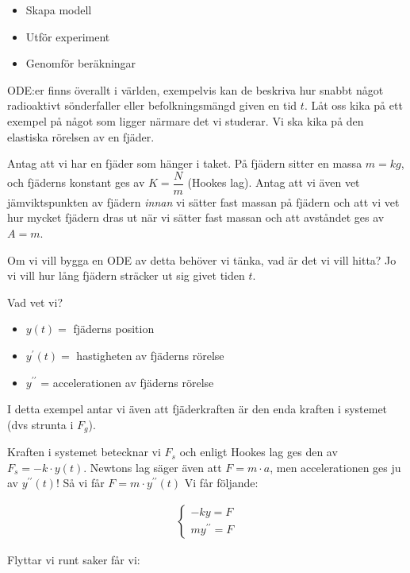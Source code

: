 \begin{itemize}
  \item Skapa modell
  \item Utför experiment
  \item Genomför beräkningar
\end{itemize}
\par\bigskip
\noindent ODE:er finns överallt i världen, exempelvis kan de beskriva hur snabbt något radioaktivt sönderfaller eller befolkningsmängd given en tid $t$. Låt oss kika på ett exempel på något som ligger närmare det vi studerar. Vi ska kika på den elastiska rörelsen av en fjäder.
\par\bigskip
\noindent Antag att vi har en fjäder som hänger i taket. På fjädern sitter en massa $m = kg$, och fjäderns konstant ges av $K = \dfrac{N}{m}$ (Hookes lag). Antag att vi även vet jämviktspunkten av fjädern \textit{innan} vi sätter fast massan på fjädern och att vi vet hur mycket fjädern dras ut när vi sätter fast massan och att avståndet ges av $A = m$.\par\noindent Om vi vill bygga en ODE av detta behöver vi tänka, vad är det vi vill hitta? Jo vi vill hur lång fjädern sträcker ut sig givet tiden $t$.
\par\bigskip
\noindent Vad vet vi?
\begin{itemize}
  \item $y(t) = $ fjäderns position
  \item $y^{\prime}(t) = $ hastigheten av fjäderns rörelse
  \item $y^{\prime\prime}$ = accelerationen av fjäderns rörelse
\end{itemize}
\par\bigskip
\noindent I detta exempel antar vi även att fjäderkraften är den enda kraften i systemet (dvs strunta i $F_g$).
\par\bigskip
\noindent Kraften i systemet betecknar vi $F_s$ och enligt Hookes lag ges den av $F_s = -k\cdot y(t)$. Newtons lag säger även att $F=m\cdot a$, men accelerationen ges ju av $y^{\prime\prime}(t)$! Så vi får $F=m\cdot y^{\prime\prime}(t)$ Vi får följande:


\begin{equation*}
  \begin{gathered}
    \begin{cases*}
      -ky = F\\
      my^{\prime\prime} = F
    \end{cases*}
  \end{gathered}
\end{equation*}
\par\bigskip
\noindent Flyttar vi runt saker får vi:


